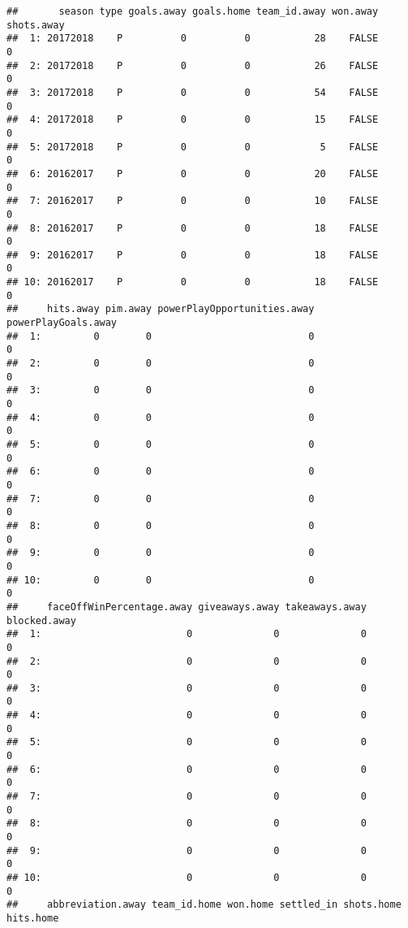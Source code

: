 \documentclass[
]{article}
\begin{document}
\begin{verbatim}
##       season type goals.away goals.home team_id.away won.away shots.away
##  1: 20172018    P          0          0           28    FALSE          0
##  2: 20172018    P          0          0           26    FALSE          0
##  3: 20172018    P          0          0           54    FALSE          0
##  4: 20172018    P          0          0           15    FALSE          0
##  5: 20172018    P          0          0            5    FALSE          0
##  6: 20162017    P          0          0           20    FALSE          0
##  7: 20162017    P          0          0           10    FALSE          0
##  8: 20162017    P          0          0           18    FALSE          0
##  9: 20162017    P          0          0           18    FALSE          0
## 10: 20162017    P          0          0           18    FALSE          0
##     hits.away pim.away powerPlayOpportunities.away powerPlayGoals.away
##  1:         0        0                           0                   0
##  2:         0        0                           0                   0
##  3:         0        0                           0                   0
##  4:         0        0                           0                   0
##  5:         0        0                           0                   0
##  6:         0        0                           0                   0
##  7:         0        0                           0                   0
##  8:         0        0                           0                   0
##  9:         0        0                           0                   0
## 10:         0        0                           0                   0
##     faceOffWinPercentage.away giveaways.away takeaways.away blocked.away
##  1:                         0              0              0            0
##  2:                         0              0              0            0
##  3:                         0              0              0            0
##  4:                         0              0              0            0
##  5:                         0              0              0            0
##  6:                         0              0              0            0
##  7:                         0              0              0            0
##  8:                         0              0              0            0
##  9:                         0              0              0            0
## 10:                         0              0              0            0
##     abbreviation.away team_id.home won.home settled_in shots.home hits.home

\end{verbatim}
\end{document}
